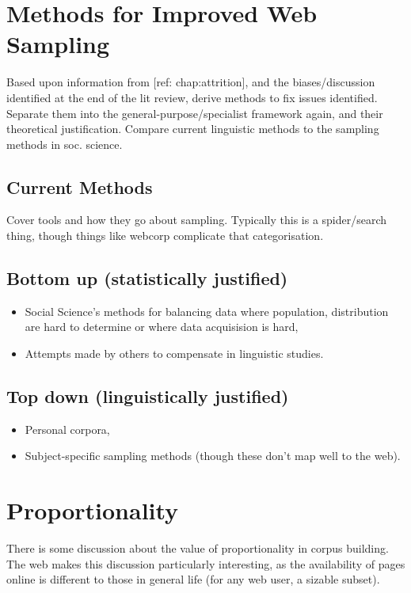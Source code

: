 
\section{Methods for Improved Web Sampling}
Based upon information from [ref: chap:attrition], and the biases/discussion identified at the end of the lit review, derive methods to fix issues identified.  Separate them into the general-purpose/specialist framework again, and their theoretical justification.  Compare current linguistic methods to the sampling methods in soc. science.

\subsection{Current Methods}
Cover tools and how they go about sampling.  Typically this is a spider/search thing, though things like webcorp complicate that categorisation.


\subsection{Bottom up (statistically justified)}
\begin{itemize}
	\item Social Science's methods for balancing data where population, distribution are hard to determine or where data acquisision is hard,
	\item Attempts made by others to compensate in linguistic studies.
\end{itemize}

\subsection{Top down (linguistically justified)}
\begin{itemize}
	\item Personal corpora,
	\item Subject-specific sampling methods (though these don't map well to the web).
\end{itemize}





\section{Proportionality}
There is some discussion about the value of proportionality in corpus building.  The web makes this discussion particularly interesting, as the availability of pages online is different to those in general life (for any web user, a sizable subset).

